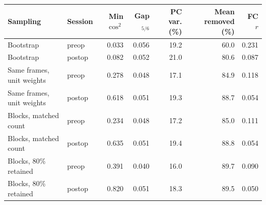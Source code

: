 \begin{tabular}{llrrrrr}
\toprule
Sampling & Session & Min $\cos^2$ & Gap$_{5/6}$ & PC var. (\%) & Mean removed (\%) & FC $r$ \\
\midrule
Bootstrap & preop & 0.033 & 0.056 & 19.2 & 60.0 & 0.231 \\
Bootstrap & postop & 0.082 & 0.052 & 21.0 & 80.6 & 0.087 \\
Same frames, unit weights & preop & 0.278 & 0.048 & 17.1 & 84.9 & 0.118 \\
Same frames, unit weights & postop & 0.618 & 0.051 & 19.3 & 88.7 & 0.054 \\
Blocks, matched count & preop & 0.234 & 0.048 & 17.2 & 85.0 & 0.111 \\
Blocks, matched count & postop & 0.635 & 0.051 & 19.4 & 88.8 & 0.054 \\
Blocks, 80\% retained & preop & 0.391 & 0.040 & 16.0 & 89.7 & 0.090 \\
Blocks, 80\% retained & postop & 0.820 & 0.051 & 18.3 & 89.5 & 0.050 \\
\bottomrule
\end{tabular}
